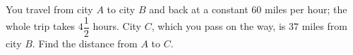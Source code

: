 You travel from city $A$ to city $B$ and back at a constant $60$ miles per hour; the whole trip takes $4\dfrac{1}{2}$ hours. City $C$, which you pass on the way, is $37$ miles from city $B$. Find the distance from $A$ to $C$.
